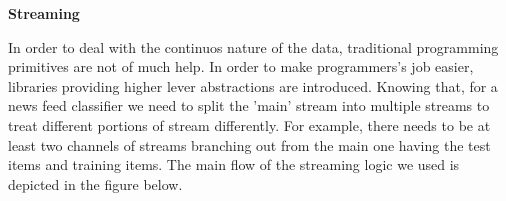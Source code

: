 \begin{center} \textbf{\huge Streaming} \end{center}
In order to deal with the continuos nature of the data, traditional programming primitives are not of much help. In order to make programmers's job easier, libraries providing higher lever abstractions are introduced. Knowing that, for a news feed classifier we need to split the 'main' stream into multiple streams to treat different portions of stream differently. For example, there needs to be at least two channels of streams branching out from the main one having the test items and training items. The main flow of the streaming logic we used is depicted in the figure below.
